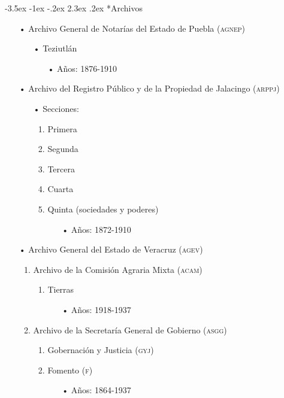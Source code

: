 \documentclass[14pt,twoside,final]{extbook} %
\makeatletter
\renewcommand\section{\@startsection {section}{1}{\z@}%
                                     {-3.5ex \@plus -1ex \@minus -.2ex}%
                                     {2.3ex \@plus .2ex}%
                                     {\normalfont\large\bfseries\sc}}
\makeatother
\begin{document}
\section*{Archivos}
\label{sec:archivos}
\begin{itemize}[noitemsep]
\item[•]Archivo General de Notarías del Estado de Puebla (\textsc{agnep})
\begin{itemize}[noitemsep]
\item[•]Teziutlán
\begin{itemize}[noitemsep]
\item[•]Años: 1876-1910
\end{itemize}
\end{itemize}
\end{itemize}
\begin{itemize}[noitemsep]
\item[•]Archivo del Registro Público y de la Propiedad de Jalacingo (\textsc{arppj})
\begin{itemize}[noitemsep]
\item[•]Secciones:
\begin{enumerate}[noitemsep]
\item Primera
\item Segunda
\item Tercera
\item Cuarta
\item Quinta (sociedades y poderes)
\begin{itemize}[noitemsep]
\item[•]Años: 1872-1910
\end{itemize}
\end{enumerate}
\end{itemize}
\end{itemize}
\begin{itemize}[noitemsep]
\item[•]Archivo General del Estado de Veracruz (\textsc{agev})
\begin{enumerate}[noitemsep]
\item Archivo de la Comisión Agraria Mixta (\textsc{acam})
\begin{enumerate}[noitemsep]
\item Tierras
\begin{itemize}[noitemsep]
\item[•]Años: 1918-1937
\end{itemize}
\end{enumerate}
\item Archivo de la Secretaría General de Gobierno (\textsc{asgg})
\begin{enumerate}[noitemsep]
\item Gobernación y Justicia (\textsc{gyj})
\item Fomento (\textsc{f})
\begin{itemize}[noitemsep]
\item[•]Años: 1864-1937
\end{itemize}
\end{enumerate}
\end{enumerate}
\end{itemize}
\end{document}
